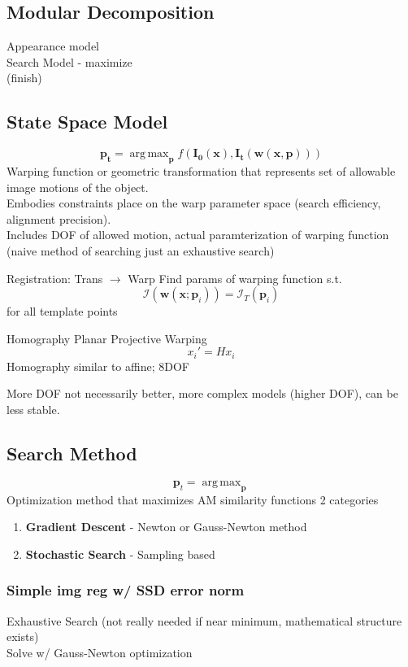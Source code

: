 \documentclass{article}
\DeclareMathOperator*{\argmax}{arg\,max}
\begin{document}
\subsection{Modular Decomposition}
Appearance model\\
Search Model - maximize 
\\
(finish)

\subsection{State Space Model}
\[
    \mathbf{p_t} = \argmax_\mathbf p f(\mathbf{I_0}(\mathbf x), \mathbf{I_t}(\mathbf w (\mathbf x, \mathbf p)))
\]
Warping function or geometric transformation that represents set of allowable image motions of the object. 
\\
Embodies constraints place on the warp parameter space (search efficiency, alignment precision).\\
Includes DOF of allowed motion, actual paramterization of warping function
\\
(naive method of searching just an exhaustive search)

\begin{expln}
    {Registration: Trans $\to$ Warp}{}
    Find params of warping function s.t. 
    \[
        \mathcal I (\mathbf w (\mathbf x;\mathbf p_i)) = \mathcal I_T (\mathbf p_i)
    \] for all template points
\end{expln}

\begin{ovr}
{Homography}{}
Planar Projective Warping
\[
    x_i' = Hx_i
\]
Homography similar to affine; 8DOF
\end{ovr}
\noindent
More DOF not necessarily better, more complex models (higher DOF), 
can be less stable.

\subsection{Search Method}
\[
    \mathbf p_t = \argmax_\mathbf p
\]
Optimization method that maximizes AM similarity functions
2 categories
\begin{enumerate}[]
    \item \textbf{Gradient Descent} - Newton or Gauss-Newton method
    \item \textbf{Stochastic Search} - Sampling based
\end{enumerate}

\subsubsection{Simple img reg w/ SSD error norm}
Exhaustive Search (not really needed if near minimum, mathematical structure exists)
\\
Solve w/ Gauss-Newton optimization
\end{document}
